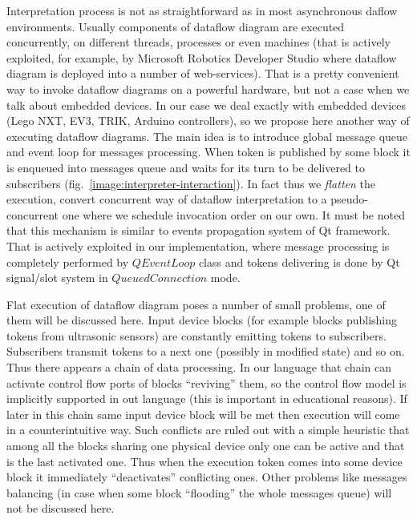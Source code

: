 \documentclass[conference,compsoc]{IEEEtran}
\begin{document}
Interpretation process is not as straightforward as in most asynchronous daflow environments. Usually components of dataflow diagram are executed concurrently, on different threads, processes or even machines (that is actively exploited, for example, by Microsoft Robotics Developer Studio where dataflow diagram is deployed into a number of web-services). That is a pretty convenient way to invoke dataflow diagrams on a powerful hardware, but not a case when we talk about embedded devices. In our case we deal exactly with embedded devices (Lego NXT, EV3, TRIK, Arduino controllers), so we propose here another way of executing dataflow diagrams. The main idea is to introduce global message queue and event loop for messages processing. When token is published by some block it is enqueued into messages queue and waits for its turn to be delivered to subscribers (fig.~\ref{image:interpreter-interaction}). In fact thus we \textit{flatten} the execution, convert concurrent way of dataflow interpretation to a pseudo-concurrent one where we schedule invocation order on our own. It must be noted that this mechanism is similar to events propagation system of Qt framework. That is actively exploited in our implementation, where message processing is completely performed by $QEventLoop$ class and tokens delivering is done by Qt signal/slot system in $QueuedConnection$ mode. 

Flat execution of dataflow diagram poses a number of small problems, one of them will be discussed here. Input device blocks (for example blocks publishing tokens from ultrasonic sensors) are constantly emitting tokens to subscribers. Subscribers transmit tokens to a next one (possibly in modified state) and so on. Thus there appears a chain of data processing. In our language that chain can activate control flow ports of blocks ``reviving'' them, so the control flow model is implicitly supported in out language (this is important in educational reasons). If later in this chain same input device block will be met then execution will come in a 
counterintuitive way. Such conflicts are ruled out with a simple heuristic that among all the blocks sharing one physical device only one can be active and that is the last activated one. Thus when the execution token comes into some device block it immediately ``deactivates'' conflicting ones. Other problems like messages balancing (in case when some block ``flooding'' the whole messages queue) will not be discussed here.
\end{document}
